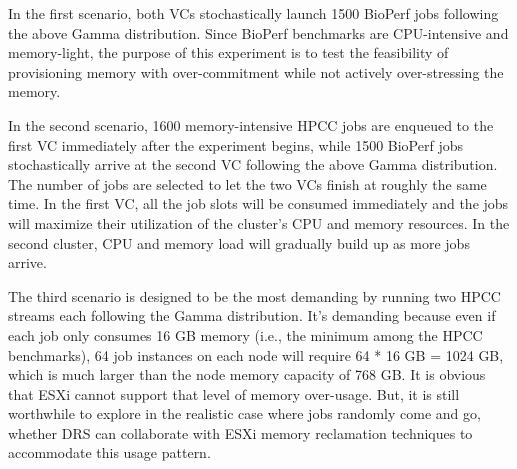 In the first scenario, both VCs stochastically launch 1500 BioPerf jobs following the above Gamma 
distribution. Since BioPerf benchmarks are CPU-intensive and memory-light, the purpose of this 
experiment is to test the feasibility of provisioning memory with over-commitment while not actively over-stressing the memory. 

In the second scenario, 1600 memory-intensive HPCC jobs are enqueued to the first VC immediately after the experiment begins, while 1500 BioPerf jobs stochastically arrive at the second VC following the above Gamma distribution. The number of jobs are selected to let the two VCs finish at roughly the same time. In the first VC, all the job slots will be consumed
immediately and the jobs will maximize their utilization of the cluster's CPU and memory resources. In the second cluster, CPU and memory load will gradually build up as more jobs arrive. 





The third scenario is designed to be the most demanding by running two HPCC streams each following the Gamma distribution. 
It's demanding because even if each job only consumes 16 GB memory (i.e., the minimum among the HPCC benchmarks), 64 job instances on each node will require 64 * 16 GB = 1024 GB, which is much larger than the node memory capacity of 768 GB. It is obvious that ESXi cannot support that level of memory over-usage. But, it is still worthwhile to explore in the realistic case where jobs randomly come and go, whether DRS can collaborate with ESXi memory reclamation techniques to accommodate this usage pattern. 

